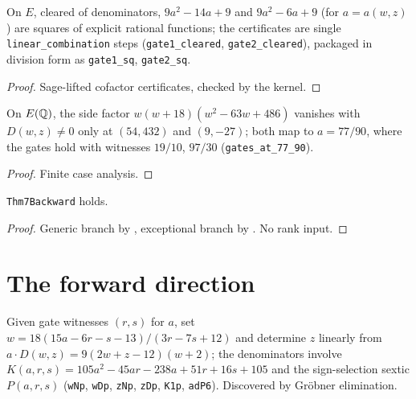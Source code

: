 \begin{lemma}\label{lem:gatescleared}
\leanok
{}
On $E$, cleared of denominators, $9a^2-14a+9$ and $9a^2-6a+9$
(for $a = a(w,z)$) are squares of explicit rational functions;
the certificates are single \texttt{linear\_combination} steps
(\texttt{gate1\_cleared}, \texttt{gate2\_cleared}), packaged in division
form as \texttt{gate1\_sq}, \texttt{gate2\_sq}.
\end{lemma}
\begin{proof}\leanok
Sage-lifted cofactor certificates, checked by the kernel.
\end{proof}

\begin{lemma}\label{lem:exceptional}
\leanok
{}
On $E(\mathbb{Q})$, the side factor $w(w+18)(w^2-63w+486)$ vanishes with
$D(w,z) \neq 0$ only at $(54,432)$ and $(9,-27)$; both map to
$a = 77/90$, where the gates hold with witnesses $19/10$, $97/30$
(\texttt{gates\_at\_77\_90}).
\end{lemma}
\begin{proof}\leanok
Finite case analysis.
\end{proof}

\begin{theorem}\label{thm:backward}
\leanok
{}
\texttt{Thm7Backward} holds.
\end{theorem}
\begin{proof}\leanok
Generic branch by , exceptional branch by
.  No rank input.
\end{proof}

\section{The forward direction}

\begin{definition}\label{def:inverse}
\leanok
{}
Given gate witnesses $(r,s)$ for $a$, set
$w = 18(15a-6r-s-13)/(3r-7s+12)$ and determine $z$ linearly from
$a \cdot D(w,z) = 9(2w+z-12)(w+2)$; the denominators involve
$K(a,r,s) = 105a^2-45ar-238a+51r+16s+105$ and the sign-selection sextic
$P(a,r,s)$ (\texttt{wNp}, \texttt{wDp}, \texttt{zNp}, \texttt{zDp},
\texttt{K1p}, \texttt{adP6}).  Discovered by Gr\"obner elimination.
\end{definition}

